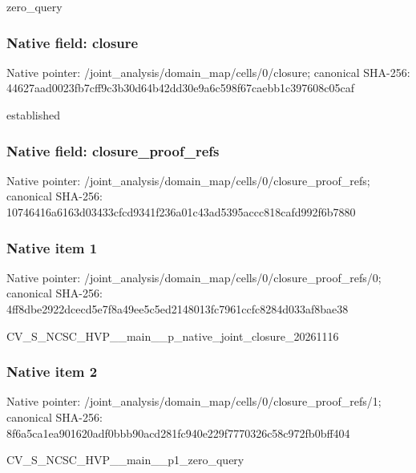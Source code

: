 \documentclass[10pt,a4paper]{article}
\begin{document}
\begingroup\raggedright\sloppy zero\_\allowbreak{}query\par\endgroup

\subsubsection{Native field: closure}
Native pointer: /joint\_\allowbreak{}analysis/domain\_\allowbreak{}map/cells/0/closure; canonical SHA-256: 44627aad0023fb7cff9c3b30d64b42dd30e9a6c598f67caebb1c397608c05caf

\begingroup\raggedright\sloppy established\par\endgroup

\subsubsection{Native field: closure\_\allowbreak{}proof\_\allowbreak{}refs}
Native pointer: /joint\_\allowbreak{}analysis/domain\_\allowbreak{}map/cells/0/closure\_\allowbreak{}proof\_\allowbreak{}refs; canonical SHA-256: 10746416a6163d03433cfcd9341f236a01c43ad5395accc818cafd992f6b7880

\subsubsection{Native item 1}
Native pointer: /joint\_\allowbreak{}analysis/domain\_\allowbreak{}map/cells/0/closure\_\allowbreak{}proof\_\allowbreak{}refs/0; canonical SHA-256: 4ff8dbe2922dcecd5e7f8a49ee5c5ed2148013fc7961ccfc8284d033af8bae38

\begingroup\raggedright\sloppy CV\_\allowbreak{}S\_\allowbreak{}NCSC\_\allowbreak{}HVP\_\allowbreak{}\_\allowbreak{}main\_\allowbreak{}\_\allowbreak{}p\_\allowbreak{}native\_\allowbreak{}joint\_\allowbreak{}closure\_\allowbreak{}20261116\par\endgroup

\subsubsection{Native item 2}
Native pointer: /joint\_\allowbreak{}analysis/domain\_\allowbreak{}map/cells/0/closure\_\allowbreak{}proof\_\allowbreak{}refs/1; canonical SHA-256: 8f6a5ca1ea901620adf0bbb90acd281fc940e229f7770326c58c972fb0bff404

\begingroup\raggedright\sloppy CV\_\allowbreak{}S\_\allowbreak{}NCSC\_\allowbreak{}HVP\_\allowbreak{}\_\allowbreak{}main\_\allowbreak{}\_\allowbreak{}p1\_\allowbreak{}zero\_\allowbreak{}query\par\endgroup
\end{document}
